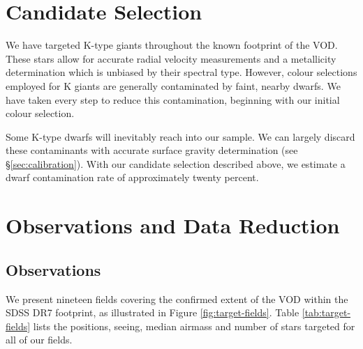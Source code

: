 \documentclass{emulateapj}
\begin{document}
\section{Candidate Selection}
We have targeted K-type giants throughout the known footprint of the VOD. These stars allow for accurate radial velocity measurements and a metallicity determination which is unbiased by their spectral type. However, colour selections employed for K giants are generally contaminated by faint, nearby dwarfs. We have taken every step to reduce this contamination, beginning with our initial colour selection.


Some K-type dwarfs will inevitably reach into our sample. We can largely discard these contaminants with accurate surface gravity determination (see \S\ref{sec:calibration}). With our candidate selection described above, we estimate a dwarf contamination rate of approximately twenty percent.

\section{Observations and Data Reduction}
\subsection{Observations}
We present nineteen fields covering the confirmed extent of the VOD within the SDSS DR7 footprint, as illustrated in Figure \ref{fig:target-fields}. Table \ref{tab:target-fields} lists the positions, seeing, median airmass and number of stars targeted for all of our fields. 
\end{document}
